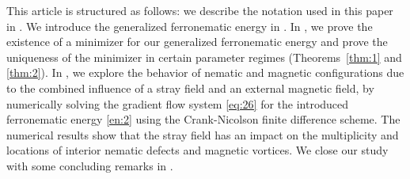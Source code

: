 \documentclass{article}
\begin{document}
This article is structured as follows: we describe the notation used in this paper in . We introduce the generalized ferronematic energy in . In , we prove the existence of a minimizer for our generalized ferronematic energy and prove the uniqueness of the minimizer in certain parameter regimes (Theorems~\ref{thm:1} and \ref{thm:2}). In , we explore the behavior of nematic and magnetic configurations due to the combined influence of a stray field and an external magnetic field, by numerically solving the gradient flow system \eqref{eq:26} for the introduced ferronematic energy \eqref{en:2} using the Crank-Nicolson finite difference scheme. The numerical results show that the stray field has an impact on the multiplicity and locations of interior nematic defects and magnetic vortices.  We close our study with some concluding remarks in .
\end{document}
